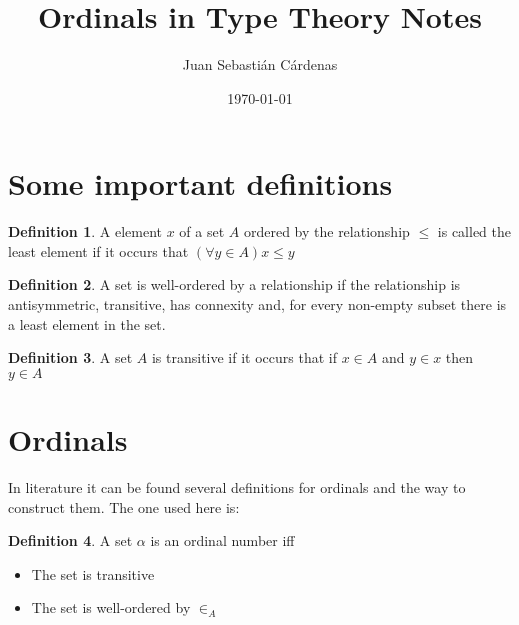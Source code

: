 \documentclass[11pt]{article}
\title{Ordinals in Type Theory Notes}
\author{Juan Sebastián Cárdenas}
\date{\today}
\theoremstyle{definition}
\newtheorem{definition}{Definition}[section]
\theoremstyle{remark}
\begin{document}
\maketitle
\section{Some important definitions}

\begin{definition}
  A element $x$ of a set $A$ ordered by the relationship $\leq$ is called the least element if it occurs that $(\forall y \in A) x \leq y$
\end{definition}

\begin{definition}
  A set is well-ordered by a relationship if the relationship is antisymmetric, transitive, has connexity and, for every non-empty subset there is a least element in the set.
\end{definition}

\begin{definition}
  A set $A$ is transitive if it occurs that if $x \in A$ and $y \in x$ then $y \in A$
\end{definition}

\section{Ordinals}
In literature it can be found several definitions for ordinals and the way to construct them. The one used here is:

\begin{definition}
  A set $\alpha$ is an ordinal number iff
  \begin{itemize}
  \item The set is transitive
  \item The set is well-ordered by $\in_A$  
  \end{itemize}
\end{definition}
\end{document}
